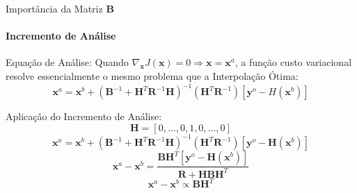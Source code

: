 \documentclass[10pt,aspectratio=169]{beamer}
\begin{document}
\begin{frame}[fragile]{Importância da Matriz $\mathbf{B}$}
\framesubtitle{Incremento de Análise}
  \begin{block}{Equação de Análise:}
  \vspace{0.5em}
    Quando $\nabla_{\mathbf{x}}{J(\mathbf{x})} = 0 \Rightarrow \mathbf{x} = \mathbf{x}^{a}$, a função custo variacional resolve essencialmente o mesmo problema que a Interpolação Ótima:
    \begin{equation*}
      \mathbf{x}^{a} = \mathbf{x}^{b} + (\mathbf{B}^{-1} + \mathbf{H}^{T}\mathbf{R}^{-1}\mathbf{H})^{-1}(\mathbf{H}^{T}\mathbf{R}^{-1})[\mathbf{y}^{o} - H(\mathbf{x}^{b})]
    \end{equation*}
  \end{block}
  \pause
  \begin{block}{Aplicação do Incremento de Análise:}  
    \vspace{-0.5em}
    \begin{equation*}
      \mathbf{H}=[0,\dots,0,1,0,\dots,0] 
    \end{equation*}
    \begin{equation*}
      \mathbf{x}^{a} = \mathbf{x}^{b} + (\mathbf{B}^{-1} + \mathbf{H}^{T}\mathbf{R}^{-1}\mathbf{H})^{-1}(\mathbf{H}^{T}\mathbf{R}^{-1})[\mathbf{y}^{o} - \mathbf{H}(\mathbf{x}^{b})] 
    \end{equation*}
    \begin{equation*}
      \mathbf{x}^{a} - \mathbf{x}^{b} = \frac{\mathbf{B}\mathbf{H}^{T}[\mathbf{y}^{o} - \mathbf{H}(\mathbf{x}^{b})]}{\mathbf{R} + \mathbf{H}\mathbf{B}\mathbf{H}^{T}} 
    \end{equation*}
    \begin{equation*}
      \mathbf{x}^{a}-\mathbf{x}^{b} \propto \mathbf{BH}^{T}
    \end{equation*}
  \end{block}
\end{frame}
\end{document}
